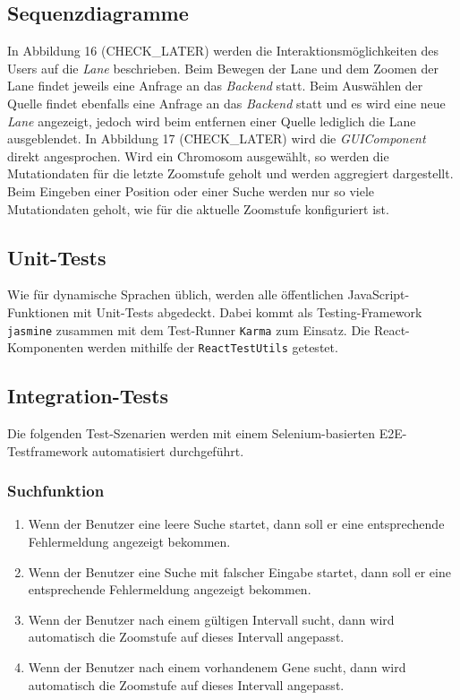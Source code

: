 \subsection{Sequenzdiagramme}
In Abbildung 16 (CHECK\_LATER) werden die Interaktionsmöglichkeiten des Users auf die \textit{Lane} beschrieben. Beim Bewegen der Lane und dem Zoomen der Lane findet jeweils eine Anfrage an das \textit{Backend} statt. Beim Auswählen der Quelle findet ebenfalls eine Anfrage an das \textit{Backend} statt und es wird eine neue \textit{Lane} angezeigt, jedoch wird beim entfernen einer Quelle lediglich die Lane ausgeblendet.
In Abbildung 17 (CHECK\_LATER) wird die \textit{GUIComponent} direkt angesprochen. Wird ein Chromosom ausgewählt, so werden die Mutationdaten für die letzte Zoomstufe geholt und werden aggregiert dargestellt. Beim Eingeben einer Position oder einer Suche werden nur so viele Mutationdaten geholt, wie für die aktuelle Zoomstufe konfiguriert ist.
\newpage
\subsection{Unit-Tests}
Wie für dynamische Sprachen üblich, werden alle öffentlichen JavaScript-Funktionen mit Unit-Tests abgedeckt. Dabei kommt als Testing-Framework \texttt{jasmine} zusammen mit dem Test-Runner \texttt{Karma} zum Einsatz. Die React-Komponenten werden mithilfe der \texttt{ReactTestUtils} getestet.

\subsection{Integration-Tests}
Die folgenden Test-Szenarien werden mit einem Selenium-basierten E2E-Testframework automatisiert durchgeführt.
\subsubsection{Suchfunktion}
\begin{enumerate}
	\item Wenn der Benutzer eine leere Suche startet, dann soll er eine entsprechende Fehlermeldung angezeigt bekommen.
	\item Wenn der Benutzer eine Suche mit falscher Eingabe startet, dann soll er eine entsprechende Fehlermeldung angezeigt bekommen.
	\item Wenn der Benutzer nach einem gültigen Intervall sucht, dann wird automatisch die Zoomstufe auf dieses Intervall angepasst.
	\item Wenn der Benutzer nach einem vorhandenem Gene sucht, dann wird automatisch die Zoomstufe auf dieses Intervall angepasst.
\end{enumerate}

